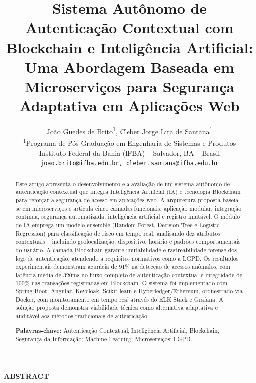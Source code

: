 \documentclass[12pt,a4paper]{article}
\title{\textbf{Sistema Autônomo de Autenticação Contextual com Blockchain e Inteligência Artificial: Uma Abordagem Baseada em Microserviços para Segurança Adaptativa em Aplicações Web}}
\author{
  João Guedes de Brito\textsuperscript{1}, Cleber Jorge Lira de Santana\textsuperscript{1} \\
  \small \textsuperscript{1}Programa de Pós-Graduação em Engenharia de Sistemas e Produtos \\
  \small Instituto Federal da Bahia (IFBA) -- Salvador, BA -- Brasil \\
  \small \texttt{joao.brito@ifba.edu.br, cleber.santana@ifba.edu.br}
}
\date{}
\begin{document}
\maketitle

\begin{abstract}
Este artigo apresenta o desenvolvimento e a avaliação de um sistema autônomo de autenticação contextual que integra Inteligência Artificial (IA) e tecnologia Blockchain para reforçar a segurança de acesso em aplicações web. A arquitetura proposta baseia-se em microserviços e articula cinco camadas funcionais: aplicação modular, integração contínua, segurança automatizada, inteligência artificial e registro imutável. O módulo de IA emprega um modelo ensemble (Random Forest, Decision Tree e Logistic Regression) para classificação de risco em tempo real, analisando dez atributos contextuais -- incluindo geolocalização, dispositivo, horário e padrões comportamentais do usuário. A camada Blockchain garante imutabilidade e rastreabilidade forense dos logs de autenticação, atendendo a requisitos normativos como a LGPD. Os resultados experimentais demonstram acurácia de 91\% na detecção de acessos anômalos, com latência média de 320ms no fluxo completo de autenticação contextual e integridade de 100\% nas transações registradas em Blockchain. O sistema foi implementado com Spring Boot, Angular, Keycloak, Scikit-learn e Hyperledger/Ethereum, orquestrado via Docker, com monitoramento em tempo real através do ELK Stack e Grafana. A solução proposta demonstra viabilidade técnica como alternativa adaptativa e auditável aos métodos tradicionais de autenticação.

\textbf{Palavras-chave:} Autenticação Contextual; Inteligência Artificial; Blockchain; Segurança da Informação; Machine Learning; Microserviços; LGPD.
\end{abstract}

\vspace{0.5cm}

\begin{center}
\textbf{ABSTRACT}
\end{center}
\end{document}
